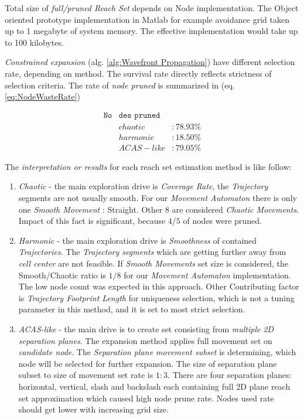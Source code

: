 \begin{note}
    Total size of \emph{full/pruned Reach Set} depends on Node implementation. The Object oriented prototype implementation in Matlab for example avoidance grid taken up to 1 megabyte of system memory. The effective implementation would take up to 100 kilobytes.
\end{note}

\emph{Constrained expansion} (alg. \ref{alg:Wavefront Propagation}) have different selection rate, depending on method. The survival rate directly reflects strictness of selection criteria. The rate of \emph{node pruned} is summarized in (eq.\ref{eq:NodeWasteRate})  

\begin{equation}\label{eq:NodeWasteRate}
    \begin{aligned}
        \texttt{No} & \texttt{des } \texttt{pruned}\\
        &chaotic   &: 78.93 \%\\
        &harmonic  &: 18.50 \%\\
        &ACAS-like &: 79.05 \%
    \end{aligned}
\end{equation}

\noindent The \emph{interpretation or results} for each reach set estimation method is like follow: 

\begin{enumerate}
    \item \emph{Chaotic} - the main exploration drive  is \emph{Coverage Rate}, the \emph{Trajectory} segments are not usually smooth. For our \emph{Movement Automaton} there is only one \emph{Smooth Movement} : Straight. Other 8 are considered \emph{Chaotic Movements}. Impact of this fact is significant, because $4/5$ of nodes were pruned.
    
    \item \emph{Harmonic} - the main exploration drive is \emph{Smoothness} of contained \emph{Trajectories}. The \emph{Trajectory segments} which are getting further away from \emph{cell center} are not feasible. If \emph{Smooth Movements} set size is considered, the Smooth/Chaotic ratio is $1/8$ for our \emph{Movement Automaton} implementation. The low node count was expected in this approach. Other Contributing factor is \emph{Trajectory Footprint Length} for uniqueness selection, which is not a tuning parameter in this method, and it is set to most strict selection.
    
    \item \emph{ACAS-like} - the main drive is to create set consisting from \emph{multiple 2D separation planes}. The expansion method applies full movement set on \emph{candidate node}. The \emph{Separation plane movement subset} is determining, which node will be selected for further expansion. The size of separation plane subset to size of movement set rate is $1:3$. There are four separation planes: horizontal, vertical, slash and backslash each containing full 2D plane reach set approximation which caused high node prune rate. Nodes used rate should get lower with increasing grid size.
    
\end{enumerate}

